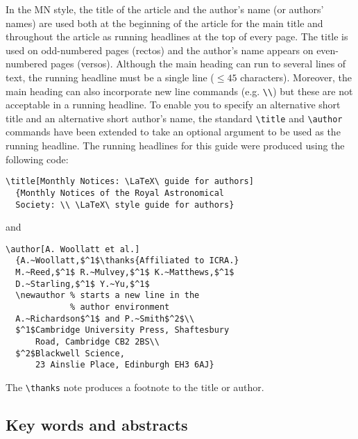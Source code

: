 In the MN style, the title of the article and the author's name (or
authors' names) are used both at the beginning of the article for the
main title and throughout the article as running headlines at the top
of every page. The title is used on odd-numbered pages (rectos) and the
author's name appears on even-numbered pages (versos). Although the
main heading can run to several lines of text, the running headline
must be a single line ($\le 45$ characters). Moreover, the main
heading can also incorporate new line commands (e.g. \verb"\\") but
these are not acceptable in a running headline. To enable you to
specify an alternative short title and an alternative short author's
name, the standard \verb"\title" and \verb"\author" commands have been
extended to take an optional argument to be used as the running
headline. The running headlines for this guide were produced using the
following code:
%
\begin{verbatim}
\title[Monthly Notices: \LaTeX\ guide for authors]
  {Monthly Notices of the Royal Astronomical 
  Society: \\ \LaTeX\ style guide for authors}
\end{verbatim}
%
and
%
\begin{verbatim}
\author[A. Woollatt et al.]
  {A.~Woollatt,$^1$\thanks{Affiliated to ICRA.} 
  M.~Reed,$^1$ R.~Mulvey,$^1$ K.~Matthews,$^1$ 
  D.~Starling,$^1$ Y.~Yu,$^1$
  \newauthor % starts a new line in the 
             % author environment
  A.~Richardson$^1$ and P.~Smith$^2$\\
  $^1$Cambridge University Press, Shaftesbury
      Road, Cambridge CB2 2BS\\
  $^2$Blackwell Science,
      23 Ainslie Place, Edinburgh EH3 6AJ}
\end{verbatim}
%
The \verb"\thanks" note produces a footnote to the title or author.

\subsection{Key words and abstracts}

